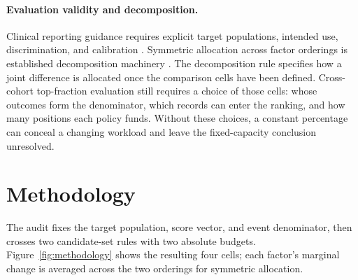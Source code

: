 \documentclass{article}
\begin{document}
\paragraph{Evaluation validity and decomposition.}
Clinical reporting guidance requires explicit target populations, intended
use, discrimination, and calibration \citep{collins2024tripod}. Symmetric
allocation across factor orderings is established decomposition machinery
\citep{kitagawa1955components,shapley1953value,shorrocks2013decomposition}.
The decomposition rule specifies how a joint difference is allocated once the
comparison cells have been defined. Cross-cohort top-fraction evaluation still
requires a choice of those cells: whose outcomes form the denominator, which
records can enter the ranking, and how many positions each policy funds.
Without these choices, a constant percentage can conceal a changing workload
and leave the fixed-capacity conclusion unresolved.

\FloatBarrier

\section{Methodology}
\label{sec:methodology}

The audit fixes the target population, score vector, and event denominator,
then crosses two candidate-set rules with two absolute budgets.
Figure~\ref{fig:methodology} shows the resulting four cells; each factor's
marginal change is averaged across the two orderings for symmetric allocation.
\end{document}
